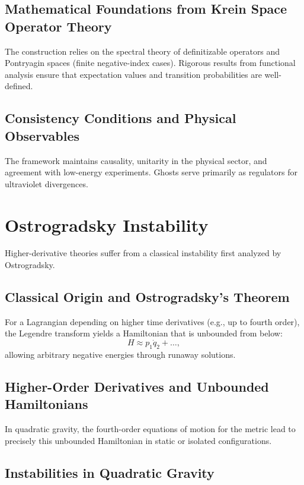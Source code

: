 \documentclass{article}
\begin{document}
\subsection{Mathematical Foundations from Krein Space Operator Theory}

The construction relies on the spectral theory of definitizable operators and Pontryagin spaces (finite negative-index cases). Rigorous results from functional analysis ensure that expectation values and transition probabilities are well-defined.

\subsection{Consistency Conditions and Physical Observables}

The framework maintains causality, unitarity in the physical sector, and agreement with low-energy experiments. Ghosts serve primarily as regulators for ultraviolet divergences.

\section{Ostrogradsky Instability}
\label{sec:ostrogradsky}

Higher-derivative theories suffer from a classical instability first analyzed by Ostrogradsky.

\subsection{Classical Origin and Ostrogradsky's Theorem}

For a Lagrangian depending on higher time derivatives (e.g., up to fourth order), the Legendre transform yields a Hamiltonian that is unbounded from below:
\[
H \approx p_1 \dot{q}_2 + \dots,
\]
allowing arbitrary negative energies through runaway solutions.

\subsection{Higher-Order Derivatives and Unbounded Hamiltonians}

In quadratic gravity, the fourth-order equations of motion for the metric lead to precisely this unbounded Hamiltonian in static or isolated configurations.

\subsection{Instabilities in Quadratic Gravity}
\end{document}
